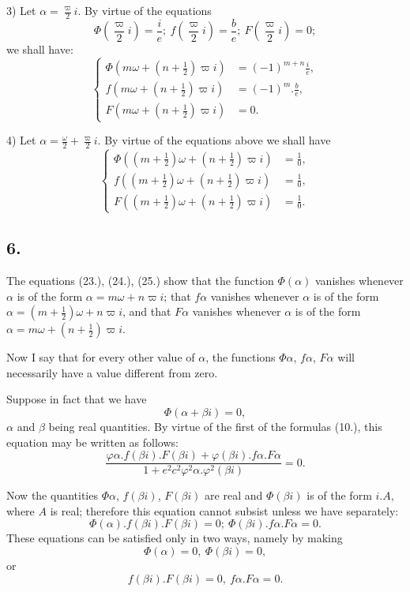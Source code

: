 \documentclass{article}
\begin{document}
3) Let $\alpha=\frac{\varpi}{2}i$. By virtue of the equations
\[ \Phi\left(\frac{\varpi}{2}i\right)=\frac{i}{e};\ f\left(\frac{\varpi}{2}i\right)=\frac{b}{e};\ F\left(\frac{\varpi}{2}i\right)=0; \]
we shall have:
\[ \left\{\begin{aligned} \Phi(m\omega+(n+\tfrac{1}{2})\varpi i)&=(-1)^{m+n}\frac{i}{e},\\ f(m\omega+(n+\tfrac{1}{2})\varpi i)&=(-1)^{m}.\frac{b}{e},\\ F(m\omega+(n+\tfrac{1}{2})\varpi i)&=0. \end{aligned}\right. \tag{25.} \]

4) Let $\alpha=\frac{\omega}{2}+\frac{\varpi}{2}i$. By virtue of the equations above we shall have
\[ \left\{\begin{aligned} \Phi((m+\tfrac{1}{2})\omega+(n+\tfrac{1}{2})\varpi i)&=\frac{1}{0},\\ f((m+\tfrac{1}{2})\omega+(n+\tfrac{1}{2})\varpi i)&=\frac{1}{0},\\ F((m+\tfrac{1}{2})\omega+(n+\tfrac{1}{2})\varpi i)&=\frac{1}{0}. \end{aligned}\right. \tag{26.} \]

\subsection*{6.}

The equations (23.), (24.), (25.) show that the function $\Phi(\alpha)$ vanishes whenever $\alpha$ is of the form $\alpha=m\omega+n\varpi i$; that $f\alpha$ vanishes whenever $\alpha$ is of the form $\alpha=(m+\frac{1}{2})\omega+n\varpi i$, and that $F\alpha$ vanishes whenever $\alpha$ is of the form $\alpha=m\omega+(n+\frac{1}{2})\varpi i$.

Now I say that for every other value of $\alpha$, the functions $\Phi\alpha$, $f\alpha$, $F\alpha$ will necessarily have a value different from zero.

Suppose in fact that we have
\[ \Phi(\alpha+\beta i)=0, \]
$\alpha$ and $\beta$ being real quantities. By virtue of the first of the formulas (10.), this equation may be written as follows:
\[ \frac{\varphi\alpha.f(\beta i).F(\beta i)+\varphi(\beta i).f\alpha.F\alpha}{1+e^{2}c^{2}\varphi^{2}\alpha.\varphi^{2}(\beta i)}=0. \]

Now the quantities $\Phi\alpha$, $f(\beta i)$, $F(\beta i)$ are real and $\Phi(\beta i)$ is of the form $i.A$, where $A$ is real; therefore this equation cannot subsist unless we have separately:
\[ \Phi(\alpha).f(\beta i).F(\beta i)=0;\ \Phi(\beta i).f\alpha.F\alpha=0. \]
These equations can be satisfied only in two ways, namely by making
\[ \Phi(\alpha)=0,\ \Phi(\beta i)=0, \]
or
\[ f(\beta i).F(\beta i)=0,\ f\alpha.F\alpha=0. \]
\end{document}
